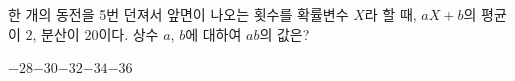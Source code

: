 한 개의 동전을 5번 던져서 앞면이 나오는 횟수를 확률변수 $X$라 할 때, $aX+b$의 평균이 $2$, 분산이 $20$이다. 상수 $a$, $b$에 대하여 $ab$의 값은? 
\begin{choices32}{$-28$}{$-30$}{$-32$}{$-34$}{$-36$}\end{choices32}
